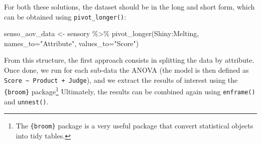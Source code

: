 \documentclass[
]{book}
\newenvironment{Shaded}{\begin{snugshade}}{\end{snugshade}}
\newcommand{\AttributeTok}[1]{\textcolor[rgb]{0.77,0.63,0.00}{#1}}
\newcommand{\ControlFlowTok}[1]{\textcolor[rgb]{0.13,0.29,0.53}{\textbf{#1}}}
\newcommand{\FunctionTok}[1]{\textcolor[rgb]{0.00,0.00,0.00}{#1}}
\newcommand{\NormalTok}[1]{#1}
\newcommand{\OtherTok}[1]{\textcolor[rgb]{0.56,0.35,0.01}{#1}}
\newcommand{\SpecialCharTok}[1]{\textcolor[rgb]{0.00,0.00,0.00}{#1}}
\newcommand{\StringTok}[1]{\textcolor[rgb]{0.31,0.60,0.02}{#1}}
\begin{document}
For both these solutions, the dataset should be in the long and short form, which can be obtained using \texttt{pivot\_longer()}:

\begin{Shaded}
\begin{Highlighting}[]
\NormalTok{senso\_aov\_data }\OtherTok{\textless{}{-}}\NormalTok{ sensory }\SpecialCharTok{\%\textgreater{}\%} 
  \FunctionTok{pivot\_longer}\NormalTok{(Shiny}\SpecialCharTok{:}\NormalTok{Melting, }\AttributeTok{names\_to=}\StringTok{"Attribute"}\NormalTok{, }\AttributeTok{values\_to=}\StringTok{"Score"}\NormalTok{)}
\end{Highlighting}
\end{Shaded}

From this structure, the first approach consists in splitting the data by attribute. Once done, we run for each sub-data the ANOVA (the model is then defined as \texttt{Score\ \textasciitilde{}\ Product\ +\ Judge}), and we extract the results of interest using the \texttt{\{broom\}} package\footnote{The \texttt{\{broom\}} package is a very useful package that convert statistical objects into tidy tables.}
Ultimately, the results can be combined again using \texttt{enframe()} and \texttt{unnest()}.

\begin{Shaded}
\end{Shaded}
\end{document}
